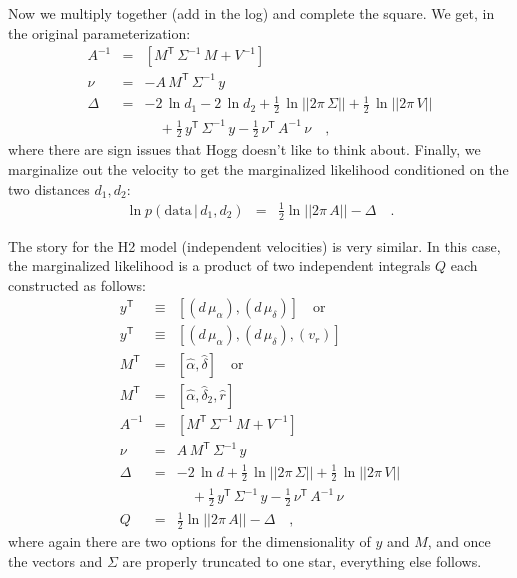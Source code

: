 \documentclass[manuscript, letterpaper]{aastex6}
\newcommand{\given}{\,|\,}
\newcommand{\transp}[1]{{#1}^{\!\mathsf{T}}}
\newcommand{\inv}[1]{{#1}^{-1}}
\newcommand{\data}{\mathrm{data}}
\begin{document}
Now we multiply together (add in the log) and complete the square.
We get, in the original parameterization:
\begin{eqnarray}
  \inv{A} &=& [\transp{M}\,\inv{\Sigma}\,M+\inv{V}]
  \\
  \nu &=& -A\,\transp{M}\,\inv{\Sigma}\,y
  \\
  \Delta &=& -2\,\ln d_1 -2\,\ln d_2
  +\frac{1}{2}\,\ln||2\pi\,\Sigma|| +\frac{1}{2}\,\ln||2\pi\,V|| \nonumber \\ && \quad
  +\frac{1}{2}\,\transp{y}\,\inv{\Sigma}\,y -\frac{1}{2}\,\transp{\nu}\,\inv{A}\,\nu
  \quad ,
\end{eqnarray}
where there are sign issues that Hogg doesn't like to think about.
Finally, we marginalize out the velocity to get the marginalized
likelihood conditioned on the two distances $d_1, d_2$:
\begin{eqnarray}
  \ln p(\data\given d_1,d_2)
  &=& \frac{1}{2}\ln ||2\pi\,A|| -\Delta
  \quad .
\end{eqnarray}

The story for the H2 model (independent velocities) is very
similar. In this case, the marginalized likelihood is a product of
two independent integrals $Q$ each constructed as follows:
\begin{eqnarray}
  \transp{y} &\equiv& [(d\,\mu_{\alpha}), (d\,\mu_{\delta})] \quad \mbox{or}
  \\
  \transp{y} &\equiv& [(d\,\mu_{\alpha}), (d\,\mu_{\delta}), (v_{r})]
  \\
  \transp{M} &=& [\hat{\alpha}, \hat{\delta}] \quad \mbox{or}
  \\
  \transp{M} &=& [\hat{\alpha}, \hat{\delta}_2, \hat{r}]
  \\
  \inv{A} &=& [\transp{M}\,\inv{\Sigma}\,M+\inv{V}]
  \\
  \nu &=& A\,\transp{M}\,\inv{\Sigma}\,y
  \\
  \Delta &=& -2\,\ln d
  +\frac{1}{2}\,\ln||2\pi\,\Sigma|| +\frac{1}{2}\,\ln||2\pi\,V|| \nonumber \\ && \quad
  +\frac{1}{2}\,\transp{y}\,\inv{\Sigma}\,y -\frac{1}{2}\,\transp{\nu}\,\inv{A}\,\nu
  \\
  Q &=& \frac{1}{2}\ln ||2\pi\,A|| -\Delta
  \quad ,
\end{eqnarray}
where again there are two options for the dimensionality of $y$ and
$M$, and once the vectors and $\Sigma$ are properly truncated to one
star, everything else follows.
\end{document}
